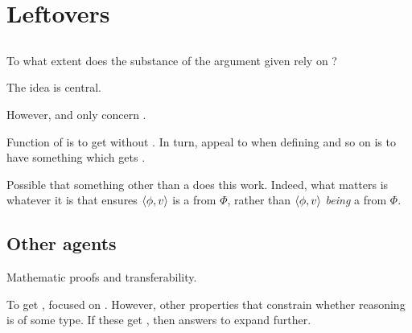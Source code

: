 
\chapter{Leftovers}
\label{cha:leftovers}


\section{}
\label{sec:fc3}


\begin{note}
  To what extent does the substance of the argument given rely on ?

  The idea is central.

  However, \qWhy{} and \qWhyV{} only concern .

  Function of  is to get \ros{} without \wit{}.
  In turn, appeal to  when defining  and so on is to have something which gets \ros{}.

  Possible that something other than a \fc{} does this work.
  Indeed, what matters is whatever it is that ensures \(\langle \phi, v \rangle\) is a \fc{} from \(\Phi\), rather than \(\langle \phi, v \rangle\) \emph{being} a \fc{} from \(\Phi\).
\end{note}



\section{Other agents}
\label{sec:other-agents}


\begin{note}
  Mathematic proofs and transferability.

  To get , focused on \tC{}.
  However, other properties that constrain whether reasoning is of some type.
  If these get \ros{}, then answers to \qWhy{} expand further.
\end{note}

